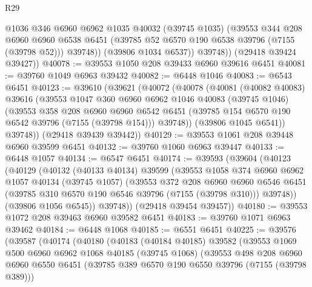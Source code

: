 \begin{lexlean}{R29}
\begin{coremodule}
              @1036
              @346
              @6960
              @6962
              @1035
              @40032
              (@39745 @1035)
              (@39553
                @344
                @208
                @6960
                @6960
                @6538
                @6451
                (@39785 @52 @6570 @190 @6538 @39796 (@7155 (@39798 @52)))
                @39748))
            (@39806 @1034 @6537))
          @39748))
      (@29418 @39424 @39427))
@40078 := @39553 @1050 @208 @39433 @6960 @39616 @6451
@40081 := @39760 @1049 @6963 @39432
@40082 := @6448 @1046
@40083 := @6543 @6451
@40123 := @39610
    (@39621
      (@40072
        (@40078
          (@40081
            (@40082 @40083)
            @39616
            (@39553
              @1047
              @360
              @6960
              @6962
              @1046
              @40083
              (@39745 @1046)
              (@39553
                @358
                @208
                @6960
                @6960
                @6542
                @6451
                (@39785 @154 @6570 @190 @6542 @39796 (@7155 (@39798 @154)))
                @39748))
            (@39806 @1045 @6541))
          @39748))
      (@29418 @39439 @39442))
@40129 := @39553 @1061 @208 @39448 @6960 @39599 @6451
@40132 := @39760 @1060 @6963 @39447
@40133 := @6448 @1057
@40134 := @6547 @6451
@40174 := @39593
    (@39604
      (@40123
        (@40129
          (@40132
            (@40133 @40134)
            @39599
            (@39553
              @1058
              @374
              @6960
              @6962
              @1057
              @40134
              (@39745 @1057)
              (@39553
                @372
                @208
                @6960
                @6960
                @6546
                @6451
                (@39785 @310 @6570 @190 @6546 @39796 (@7155 (@39798 @310)))
                @39748))
            (@39806 @1056 @6545))
          @39748))
      (@29418 @39454 @39457))
@40180 := @39553 @1072 @208 @39463 @6960 @39582 @6451
@40183 := @39760 @1071 @6963 @39462
@40184 := @6448 @1068
@40185 := @6551 @6451
@40225 := @39576
    (@39587
      (@40174
        (@40180
          (@40183
            (@40184 @40185)
            @39582
            (@39553
              @1069
              @500
              @6960
              @6962
              @1068
              @40185
              (@39745 @1068)
              (@39553
                @498
                @208
                @6960
                @6960
                @6550
                @6451
                (@39785 @389 @6570 @190 @6550 @39796 (@7155 (@39798 @389)))

\end{coremodule}
\end{lexlean}
